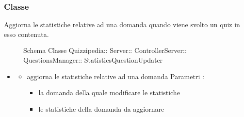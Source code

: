 \subsubsection{Classe }
Aggiorna le statistiche relative ad una domanda quando viene svolto un quiz in esso contenuta.
\begin{figure}[H]
\centering
\noindent{}
\caption[Schema Classe StatisticsQuestionUpdater]{Schema Classe Quizzipedia:: Server:: ControllerServer:: QuestionsManager:: StatisticsQuestionUpdater}
\end{figure}
\begin{itemize}
\item {}
\begin{itemize}
\item {}
\newline
aggiorna le statistiche relative ad una domanda
\newline
Parametri :
\begin{itemize}
\item {}
\newline
la domanda della quale modificare le statistiche
\item {}
\newline
le statistiche della domanda da aggiornare
\end{itemize}
\end{itemize}
\end{itemize}
